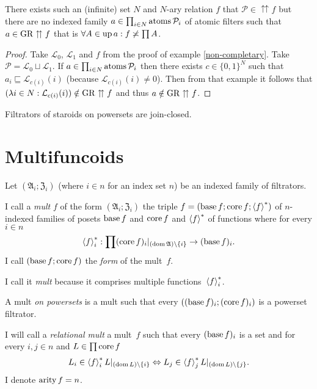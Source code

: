 \begin{example}\label{no-intrs}
There exists such an (infinite) set $N$ and $N$-ary relation $f$
that $\mathcal{P}\in\upuparrows f$ but there are no indexed family
$a\in\prod_{i\in N}\operatorname{atoms}\mathcal{P}_{i}$ of atomic filters such
that $a\in\operatorname{GR}\upuparrows f$ that is $\forall A\in\operatorname{up} a:f\not\asymp\prod A$.\end{example}
\begin{proof}
Take $\mathcal{L}_{0}$, $\mathcal{L}_{1}$ and $f$ from the proof
of example \ref{non-completary}. Take $\mathcal{P}=\mathcal{L}_{0}\sqcup\mathcal{L}_{1}$.
If $a\in\prod_{i\in N}\operatorname{atoms}\mathcal{P}_{i}$ then there exists $c\in\{0,1\}^{N}$
such that $a_{i}\sqsubseteq\mathcal{L}_{c(i)}(i)$ (because $\mathcal{L}_{c(i)}(i)\neq0$).
Then from that example it follows that $(\lambda i\in N:\mathcal{L}_{c(i)}(i))\notin\operatorname{GR}\upuparrows f$
and thus $a\notin\operatorname{GR}\upuparrows f$.\end{proof}
\begin{conjecture}
Filtrators of staroids on powersets are join-closed.
\end{conjecture}

\section{Multifuncoids}
\begin{defn}
Let $(\mathfrak{A}_{i};\mathfrak{Z}_{i})$ (where $i\in n$
for an index set $n$) be an indexed family of filtrators.

I call a \emph{mult} $f$ of the form $(\mathfrak{A}_{i};\mathfrak{Z}_{i})$
the triple $f=(\operatorname{base} f;\operatorname{core} f;\left\langle f\right\rangle ^{\ast})$ of $n$-indexed families
of posets $\operatorname{base} f$ and $\operatorname{core} f$ and $\left\langle f\right\rangle ^{\ast}$ of functions
where for every $i\in n$ 
\[
\left\langle f\right\rangle ^{\ast}_{i}:\prod(\operatorname{core} f)_{i}|_{(\operatorname{dom}\mathfrak{A})\setminus\{i\}}\rightarrow(\operatorname{base} f)_{i}.
\]
I call $(\operatorname{base} f;\operatorname{core} f)$ the \emph{form} of the mult~$f$.\end{defn}
\begin{rem}
I call it \emph{mult} because it comprises multiple functions~$\left\langle f\right\rangle ^{\ast}_{i}$.
\end{rem}

\begin{defn}
A mult \emph{on powersets} is a mult such
that every $((\operatorname{base} f)_{i};(\operatorname{core} f)_{i})$ is a powerset filtrator.
\end{defn}

\begin{defn}
I will call a \emph{relational mult} a mult~$f$
such that every $(\operatorname{base} f)_{i}$ is a set and for every $i,j\in n$
and $L\in\prod\operatorname{core} f$ 
\[
L_{i}\in\left\langle f\right\rangle ^{\ast}_{i}L|_{(\operatorname{dom} L)\setminus\{i\}}\Leftrightarrow L_{j}\in\left\langle f\right\rangle ^{\ast}_{j}L|_{(\operatorname{dom} L)\setminus\{j\}}.
\]
I denote $\operatorname{arity} f=n$.
\end{defn}

